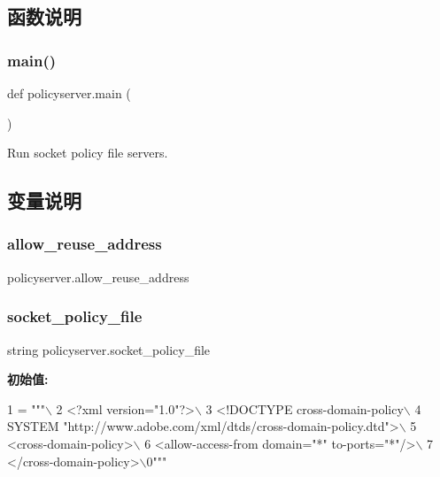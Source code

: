 \subsection{函数说明}
\mbox{\label{namespacepolicyserver_ab37343f5b6097b691f5efd9ae45036e3}} 
\subsubsection{\texorpdfstring{main()}{main()}}
{\footnotesize\ttfamily def policyserver.\+main (\begin{DoxyParamCaption}{ }\end{DoxyParamCaption})}

\begin{DoxyVerb}Run socket policy file servers.\end{DoxyVerb}
 

\subsection{变量说明}
\mbox{\label{namespacepolicyserver_aa784b6304155ce0934d42d59eee3578f}} 
\subsubsection{\texorpdfstring{allow\+\_\+reuse\+\_\+address}{allow\_reuse\_address}}
{\footnotesize\ttfamily policyserver.\+allow\+\_\+reuse\+\_\+address}

\mbox{\label{namespacepolicyserver_a6a9b70cac80cf2d7fe69f6effc595f13}} 
\subsubsection{\texorpdfstring{socket\+\_\+policy\+\_\+file}{socket\_policy\_file}}
{\footnotesize\ttfamily string policyserver.\+socket\+\_\+policy\+\_\+file}

{\bfseries 初始值\+:}
\begin{DoxyCode}
1 =  \textcolor{stringliteral}{"""\(\backslash\)}
2 \textcolor{stringliteral}{<?xml version="1.0"?>\(\backslash\)}
3 \textcolor{stringliteral}{<!DOCTYPE cross-domain-policy\(\backslash\)}
4 \textcolor{stringliteral}{ SYSTEM "http://www.adobe.com/xml/dtds/cross-domain-policy.dtd">\(\backslash\)}
5 \textcolor{stringliteral}{<cross-domain-policy>\(\backslash\)}
6 \textcolor{stringliteral}{<allow-access-from domain="*" to-ports="*"/>\(\backslash\)}
7 \textcolor{stringliteral}{</cross-domain-policy>\(\backslash\)0"""}
\end{DoxyCode}
